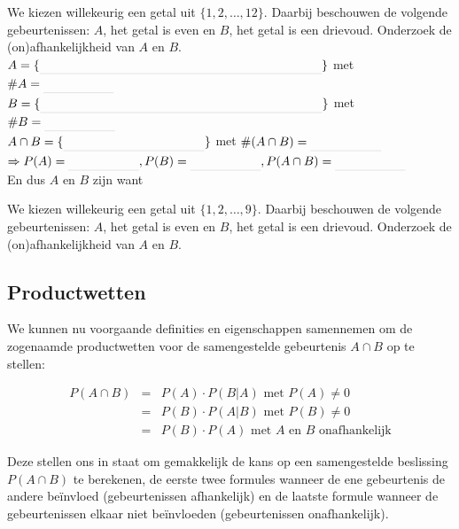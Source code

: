 \documentclass[12pt,twoside]{article}
\begin{document}
\begin{oefening} We kiezen willekeurig een getal uit $\{1,2,\ldots, 12\}$. Daarbij beschouwen de volgende gebeurtenissen: $A$, het getal is even en $B$, het getal is een drievoud. Onderzoek de (on)afhankelijkheid van $A$ en $B$.\\
$A=\{\arule{8cm}\}$ met $\#A=\arule{2cm}$\\
$B=\{\arule{8cm}\}$ met $\#B=\arule{2cm}$\\

$A\cap B=\{\arule{4cm}\}$ met $\#(A\cap B)=\arule{2cm}$\\

$\Rightarrow P(A)=\arule{2cm}, P(B)=\arule{2cm}, P(A\cap B)=\arule{2cm}$\\

En dus $A$ en $B$ zijn \arule{4cm} want \arule{4cm}
\end{oefening}

\begin{oefening}
We kiezen willekeurig een getal uit $\{1,2,\ldots, 9\}$. Daarbij beschouwen de volgende gebeurtenissen: $A$, het getal is even en $B$, het getal is een drievoud. Onderzoek de (on)afhankelijkheid van $A$ en $B$.
\end{oefening}

\subsection{Productwetten}

We kunnen nu voorgaande definities en eigenschappen samennemen om de zogenaamde productwetten voor de samengestelde gebeurtenis $A\cap B$ op te stellen:\\

\begin{mdframed}\vspace*{-0.5cm}
\begin{eqnarray*}
  P(A\cap B) &=& P(A)\cdot P(B|A) \mbox{ met } P(A)\neq 0\\
             &=& P(B)\cdot P(A|B) \mbox{ met } P(B)\neq 0\\
             &=& P(B)\cdot P(A) \mbox{ met $A$ en $B$ onafhankelijk}
\end{eqnarray*}
\end{mdframed}

Deze stellen ons in staat om gemakkelijk de kans op een samengestelde beslissing $P(A\cap B)$ te berekenen, de eerste twee formules wanneer de ene gebeurtenis de andere beïnvloed (gebeurtenissen afhankelijk) en de laatste formule wanneer de gebeurtenissen elkaar niet beïnvloeden (gebeurtenissen onafhankelijk).
\end{document}
